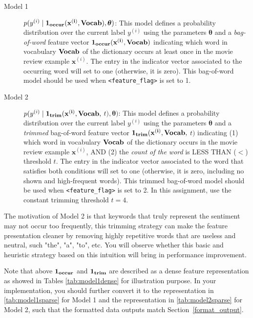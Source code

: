 \documentclass[11pt]{article}
\numberwithin{equation}{section} %
\numberwithin{figure}{section} %
\numberwithin{table}{section} %
\def\x{\mathbf x}
\newcommand{\thetav     }{\boldsymbol \theta     }
\begin{document}
\begin{description}
    \item[Model 1] $p(y^{(i)} \mid \bf{1}_{occur}( \x^{(i)},Vocab), \thetav)$: This model defines a probability distribution over the current label $y^{(i)}$ using the parameters $\thetav$ and a \emph{bag-of-word} feature vector $\bf{1}_{occur}( \x^{(i)},Vocab)$ indicating which word in vocabulary $\bf{Vocab}$ of the dictionary occurs at least once in the movie review example $\x^{(i)}$. The entry in the indicator vector associated  to the occurring word will set to one (otherwise, it is zero). This bag-of-word model should be used when \texttt{<feature\_flag>} is set to 1.
    
    \item[Model 2] $p(y^{(i)} \mid \bf{1}_{trim}(  \x^{(i)},Vocab,$ $t), \thetav)$: This model defines a probability distribution over the current label $y^{(i)}$ using the parameters $\thetav$ and a \emph{trimmed} bag-of-word feature vector $\bf{1}_{trim}( \x^{(i)},Vocab,$ $t)$ indicating  (1) which word in vocabulary $\bf{Vocab}$ of the dictionary occurs in the movie review example $\x^{(i)}$, AND (2) the \emph{count of the word} is LESS THAN ($<$) threshold $t$. The entry in the indicator vector associated  to the word that satisfies both conditions will set to one (otherwise, it is zero, including no shown and high-frequent words). This trimmed bag-of-word model should be used when \texttt{<feature\_flag>} is set to 2. In this assignment, use the constant trimming threshold $t=4$.
    
\end{description}

The motivation of Model 2 is that keywords that truly represent the sentiment may not occur too frequently, this trimming strategy can make the feature presentation cleaner by removing highly repetitive words that are useless and neutral, such "the", "a", "to", etc. You will observe whether this basic and heuristic strategy based on this intuition will bring in performance improvement.

Note that above $\bf{1}_{occur}$ and $\bf{1}_{trim}$ are described as a dense feature representation as showed in Tables \ref{tab:model1dense} for illustration purpose. In your implementation, you should further convert it to the representation in \ref{tab:model1sparse} for Model 1 and the representation in \ref{tab:model2sparse} for Model 2, such that the formatted data outputs match Section~\ref{format_output}.
\end{document}
